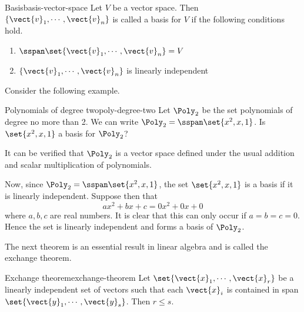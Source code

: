 \begin{definition}{Basis}{basis-vector-space}
Let $V$ be a vector space. Then $\{\vect{v}_{1},\cdots ,\vect{v}_{n}\}$ is called a basis for $V$ if the following conditions hold.
\begin{enumerate}
\item
$\sspan\set{\vect{v}_{1},\cdots ,\vect{v}_{n}} = V$
\item
$\{\vect{v}_{1},\cdots ,\vect{v}_{n}\}$ is linearly independent
\end{enumerate}
\end{definition}

Consider the following example.

\begin{example}{Polynomials of degree two}{poly-degree-two}
Let $\Poly_2$ be the set polynomials of degree no more than 2. We can write
$\Poly_2=\sspan\set{x^{2}, x, 1}$. Is $\set{x^{2}, x, 1} $ a
basis for $\Poly_2$?
\end{example}

\begin{solution}
It can be verified that $\Poly_2$ is a vector space defined under the usual addition and scalar multiplication of polynomials. 

Now, since $\Poly_2=\sspan\set{x^{2},x, 1}$, the set  $\set{x^{2}, x, 1} $ is a basis if it is linearly independent. Suppose then that 
\begin{equation*}
ax^{2}+bx+c=0x^2 + 0x + 0 
\end{equation*}
where $a,b,c$ are real numbers. It is clear that this can only occur if $a=b=c=0$. Hence the set is linearly independent and forms a basis of $\Poly_2$.
\end{solution}

The next theorem is an essential result in linear algebra and is called the exchange theorem.

\begin{theorem}{Exchange theorem}{exchange-theorem}
Let $\set{\vect{x}_{1},\cdots ,\vect{x}_{r}} $
be a linearly independent set of vectors such that each $\vect{x}_{i}$ is
contained in span$\set{\vect{y}_{1},\cdots ,\vect{y}_{s}}$. Then $
r\leq s$.
\end{theorem}

